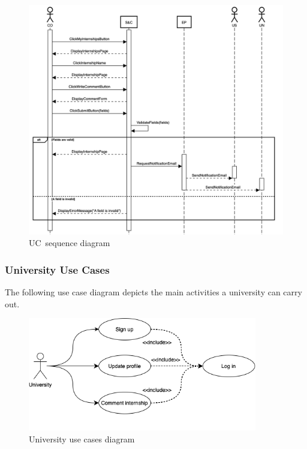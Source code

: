 \begin{figure}
    \centering \includegraphics[width=16cm]{images/sequence-diagrams/company-comments-internship.png}
    \caption{UC\theuc\ sequence diagram}
\end{figure}


\clearpage
\subsubsection{University Use Cases}
The following use case diagram depicts the main activities a university can carry out.

\begin{figure}[h]
   \centering    \includegraphics[width=10cm]{images/use-case-diagrams/university.png}
    \caption{University use cases diagram}
\end{figure}

